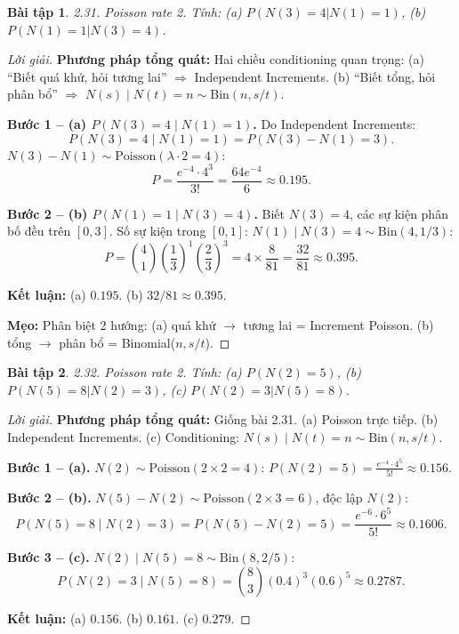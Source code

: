 \documentclass[8pt,a4paper]{article}
\newtheorem{exercise}{Bài tập}
\newenvironment{solution}{\begin{proof}[Lời giải]}{\end{proof}}
\begin{document}
\begin{exercise}
2.31. Poisson rate 2. Tính: (a) $P(N(3)=4 | N(1)=1)$, (b) $P(N(1)=1 | N(3)=4)$.
\end{exercise}
\begin{solution}
\textbf{Phương pháp tổng quát:} Hai chiều conditioning quan trọng: (a) ``Biết quá khứ, hỏi tương lai'' $\Rightarrow$ Independent Increments. (b) ``Biết tổng, hỏi phân bổ'' $\Rightarrow$ $N(s) \mid N(t)=n \sim \text{Bin}(n, s/t)$.

\textbf{Bước 1 -- (a) $P(N(3)=4 \mid N(1)=1)$.} Do Independent Increments:
\[
  P(N(3)=4 \mid N(1)=1) = P(N(3)-N(1)=3).
\]
$N(3)-N(1) \sim \text{Poisson}(\lambda \cdot 2 = 4)$:
\[
  P = \frac{e^{-4} \cdot 4^3}{3!} = \frac{64e^{-4}}{6} \approx \boxed{0.195}.
\]

\textbf{Bước 2 -- (b) $P(N(1)=1 \mid N(3)=4)$.} Biết $N(3)=4$, các sự kiện phân bố đều trên $[0,3]$. Số sự kiện trong $[0,1]$: $N(1) \mid N(3)=4 \sim \text{Bin}(4, 1/3)$:
\[
  P = \binom{4}{1}\left(\frac{1}{3}\right)^1\left(\frac{2}{3}\right)^3 = 4 \times \frac{8}{81} = \boxed{\frac{32}{81} \approx 0.395}.
\]

\textbf{Kết luận:} (a) $0.195$. (b) $32/81 \approx 0.395$.

\textbf{Mẹo:} Phân biệt 2 hướng: (a) quá khứ $\to$ tương lai = Increment Poisson. (b) tổng $\to$ phân bổ = Binomial($n, s/t$).
\end{solution}

\begin{exercise}
2.32. Poisson rate 2. Tính: (a) $P(N(2)=5)$, (b) $P(N(5)=8 | N(2)=3)$, (c) $P(N(2)=3 | N(5)=8)$.
\end{exercise}
\begin{solution}
\textbf{Phương pháp tổng quát:} Giống bài 2.31. (a) Poisson trực tiếp. (b) Independent Increments. (c) Conditioning: $N(s) \mid N(t)=n \sim \text{Bin}(n, s/t)$.

\textbf{Bước 1 -- (a).} $N(2) \sim \text{Poisson}(2 \times 2 = 4)$: $P(N(2)=5) = \frac{e^{-4} \cdot 4^5}{5!} \approx \boxed{0.156}$.

\textbf{Bước 2 -- (b).} $N(5)-N(2) \sim \text{Poisson}(2 \times 3 = 6)$, độc lập $N(2)$:
\[
  P(N(5)=8 \mid N(2)=3) = P(N(5)-N(2)=5) = \frac{e^{-6} \cdot 6^5}{5!} \approx \boxed{0.1606}.
\]

\textbf{Bước 3 -- (c).} $N(2) \mid N(5)=8 \sim \text{Bin}(8, 2/5)$:
\[
  P(N(2)=3 \mid N(5)=8) = \binom{8}{3}(0.4)^3(0.6)^5 \approx \boxed{0.2787}.
\]

\textbf{Kết luận:} (a) $0.156$. (b) $0.161$. (c) $0.279$.
\end{solution}
\end{document}
